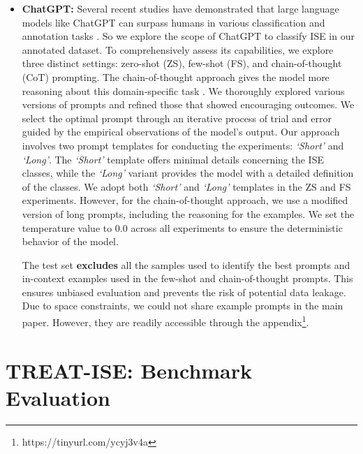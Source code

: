 \documentclass[letterpaper]{article} %
\begin{document}
\begin{itemize}
    \item \textbf{ChatGPT:} Several recent studies have demonstrated that large language models like ChatGPT can surpass humans in various classification and annotation tasks \cite{10.1001/jamainternmed.2023.2909, Gilardi_2023}. So we explore the scope of ChatGPT \cite{ouyang2022training} to classify ISE in our annotated dataset. To comprehensively assess its capabilities, we explore three distinct settings: zero-shot (ZS), few-shot (FS), and chain-of-thought (CoT) \cite{NEURIPS2022_9d560961} prompting. The chain-of-thought approach gives the model more reasoning about this domain-specific task \cite{min-etal-2022-rethinking}. 
    We thoroughly explored various versions of prompts and refined those that showed encouraging outcomes. We select the optimal prompt through an iterative process of trial and error guided by the empirical observations of the model's output. Our approach involves two prompt templates for conducting the experiments: \textit{`Short'} and \textit{`Long'}. The \textit{`Short'} template offers minimal details concerning the ISE classes, while the \textit{`Long'} variant provides the model with a detailed definition of the classes. We adopt both \textit{`Short'} and \textit{`Long'} templates in the ZS and FS experiments. However, for the chain-of-thought approach, we use a modified version of long prompts, including the reasoning for the examples. We set the temperature value to 0.0 across all experiments to ensure the deterministic behavior of the model. 
    
    The test set \textbf{excludes} all the samples used to identify the best prompts and in-context examples used in the few-shot and chain-of-thought prompts. This ensures unbiased evaluation and prevents the risk of potential data leakage. Due to space constraints, we could not share example prompts in the main paper. However, they are readily accessible through the appendix\footnote{https://tinyurl.com/ycyj3v4a}.
    
\end{itemize}




\section{TREAT-ISE: Benchmark Evaluation}
\end{document}
